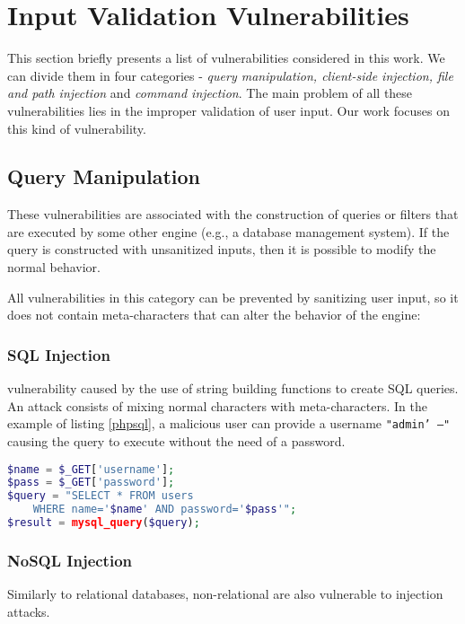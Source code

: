 \section{Input Validation Vulnerabilities}
This section briefly presents a list of vulnerabilities considered in this work. We can divide them in four categories \cite{iberia} - \textit{query manipulation, client-side injection, file and path injection} and \textit{command injection}. The main problem of all these vulnerabilities lies in the improper validation of user input. Our work focuses on this kind of vulnerability.

\subsection{Query Manipulation}
These vulnerabilities are associated with the construction of queries or filters that are executed by some other engine (e.g., a database management system). If the query is constructed with unsanitized inputs, then it is possible to modify the normal behavior. 

All vulnerabilities in this category can be prevented by sanitizing user input, so it does not contain meta-characters that can alter the behavior of the engine:

\subsubsection{SQL Injection} vulnerability caused by the use of string building functions to create SQL queries. An attack consists of mixing normal characters with meta-characters. In the example of listing \ref{phpsql}, a malicious user can provide a username \texttt{"admin' ---"} causing the query to execute without the need of a password. 

\begin{lstlisting}[language=PHP,
    showstringspaces=false,
    caption={PHP code vulnerable to SQL Injection},
    label=phpsql]
$name = $_GET['username'];
$pass = $_GET['password'];
$query = "SELECT * FROM users 
    WHERE name='$name' AND password='$pass'"; 
$result = mysql_query($query);
\end{lstlisting}


\subsubsection{NoSQL Injection} Similarly to relational databases, non-relational are also vulnerable to injection attacks. 

